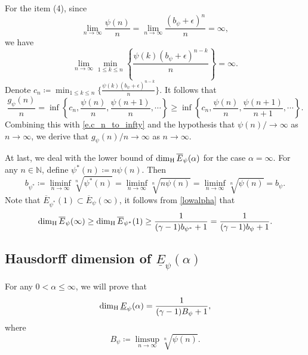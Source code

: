 \documentclass[12pt,reqno]{amsart}
\renewcommand{\=}{\coloneqq}
\theoremstyle{plain}
\begin{document}
 For the item (4), since \begin{equation*}
        \lim_{n\to \infty}\frac{\psi(n)}{n}=\lim_{n\to \infty}\frac{(b_\psi+\epsilon)^n}{n}=\infty,
    \end{equation*}
    we have
    \begin{equation}\label{e.c_n_to_infty}
        \lim_{n\to \infty}\min_{1\leq k\leq n}\left\{
         \frac{\psi(k)(b_\psi+\epsilon)^{n-k}}{n}\right\}=\infty.
    \end{equation}
  Denote $c_n \coloneqq \min_{1\leq k\leq n}\{\frac{\psi(k)(b_\psi+\epsilon)^{n-k}}{n}\}$. It follows that
    \begin{equation*}
        \frac{g_{\psi}(n)}{n}=\inf\left\{
        c_n,
        \frac{\psi(n)}{n},
        \frac{\psi(n+1)}{n},
        \cdots\right\}
        \geq
        \inf\left\{
        c_n,
        \frac{\psi(n)}{n},
        \frac{\psi(n+1)}{n+1},
        \cdots\right\}.
    \end{equation*}
Combining this with \eqref{e.c_n_to_infty} and the hypothesis that $\psi(n)/\to \infty$ as $n \to \infty$, we derive that $g_{\psi}(n)/n\to \infty$ as $n \to \infty$.

At last, we deal with the lower bound of $\dim_{\rm H}\overline{E}_{\psi}(\alpha)$ for the case $\alpha =\infty$. For any $n \in \mathbb N$, define $\psi^*(n)\coloneqq n\psi(n)$. Then
\begin{equation*}
   b_{\psi^*}\coloneqq \liminf_{n\to \infty}\sqrt[n]{\psi^*(n)} = \liminf_{n\to \infty}\sqrt[n]{n\psi(n)}= \liminf_{n\to \infty}\sqrt[n]{\psi(n)} =b_\psi.
\end{equation*}
Note that $\overline{E}_{\psi^*}(1) \subset \overline{E}_{\psi}(\infty)$, it follows from \eqref{lowalpha} that
\[
\dim_{\rm H} \overline{E}_{\psi}(\infty) \geq \dim_{\rm H}\overline{E}_{\psi^*}(1) \geq \frac{1}{(\gamma-1)b_{\psi^*}+1} = \frac{1}{(\gamma-1)b_{\psi}+1}.
\]


\subsection{Hausdorff dimension of $\underline{E}_{\psi}(\alpha)$}\label{Eunderline}


For any $0<\alpha \leq \infty$, we will prove that
\begin{equation}\label{Bpsiequal}
\dim_{\rm H}\underline{E}_{\psi}(\alpha)=\frac{1}{(\gamma-1)B_\psi+1},
\end{equation}
where
\begin{equation*} \label{bproof}
   B_\psi\coloneqq \limsup_{n\to \infty}\sqrt[n]{\psi(n)}.
\end{equation*}
\end{document}
